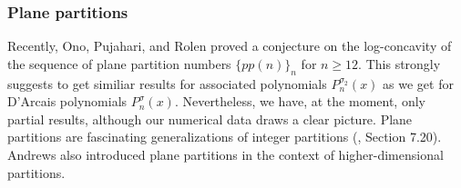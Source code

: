 \documentclass[11pt,reqno]{amsart}
\theoremstyle{plain}
\theoremstyle{remark}
\theoremstyle{definition}
\numberwithin{equation}{section}
\begin{document}
\subsubsection{Plane
partitions}
Recently, Ono, Pujahari, and Rolen \cite{OPR22} proved a conjecture
\cite{HNT23} on the log-concavity of the sequence of plane 
partition numbers $\{pp(n)\}_n$ for $n\geq 12$. This strongly suggests to 
get similiar results for associated
polynomials $P_n^{\sigma_2}(x)$ as we get for D'Arcais polynomials $P_n^{\sigma}(x)$. Nevertheless, we have, at the moment, only partial results, although our numerical data draws a clear picture.
Plane partitions are fascinating generalizations of 
integer partitions
(\cite{St99}, Section 7.20). Andrews \cite{An98}
also introduced
plane partitions in the context of higher-dimensional partitions. 
\end{document}
